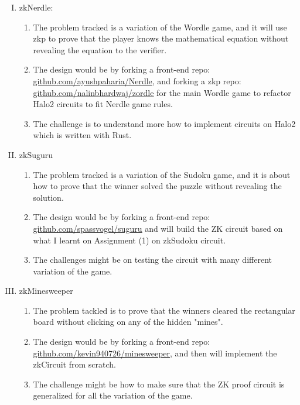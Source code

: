 \documentclass[letterpaper, 10 pt, conference]{ieeeconf}  %
\begin{document}
\begin{enumerate}[I.]
\item zkNerdle:
    \begin{enumerate}
        \item The problem tracked is a variation of the Wordle game, and it will use zkp to prove that the player knows the mathematical equation without revealing the equation to the verifier.
        \item The design would be by forking a front-end repo: \href{https://github.com/ayushpaharia/Nerdle}{\underline{github.com/ayushpaharia/Nerdle}}, and forking a zkp repo: \href{https://github.com/nalinbhardwaj/zordle}{\underline{github.com/nalinbhardwaj/zordle}} for the main Wordle game to refactor Halo2 circuits to fit Nerdle game rules.   
        \item The challenge is to understand more how to implement circuits on Halo2 which is written with Rust.
    \end{enumerate}
\item zkSuguru
    \begin{enumerate}
        \item The problem tracked is a variation of the Sudoku game, and it is about how to prove that the winner solved the puzzle without revealing the solution.
        \item The design would be by forking a front-end repo: \href{https://github.com/spassvogel/suguru}{\underline{github.com/spassvogel/suguru}} and will build the ZK circuit based on what I learnt on Assignment (1) on zkSudoku circuit.
        \item The challenges might be on testing the circuit with many different variation of the game. 
    \end{enumerate}
\item zkMinesweeper
    \begin{enumerate}
        \item The problem tackled is to prove that the winners cleared the rectangular board without clicking on any of the hidden "mines". 
        \item The design would be by forking a front-end repo: \href{https://github.com/kevin940726/minesweeper}{\underline{github.com/kevin940726/minesweeper}}, and then will implement the zkCircuit from scratch. 
        \item The challenge might be how to make sure that the ZK proof circuit is generalized for all the variation of the game. 
    \end{enumerate}
\end{enumerate}
\end{document}
